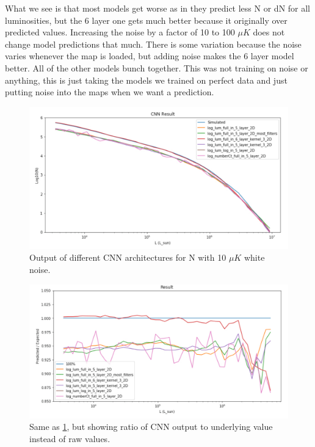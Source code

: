 \documentclass{article}
\begin{document}
			What we see is that most models get worse as in they predict less N or dN for all luminosities, but the 6 layer one gets much better because it originally over predicted values.  Increasing the noise by a factor of 10 to 100 \(\mu K\) does not change model predictions that much.  There is some variation because the noise varies whenever the map is loaded, but adding noise makes the 6 layer model better.  All of the other models bunch together.  This was not training on noise or anything, this is just taking the models we trained on perfect data and just putting noise into the maps when we want a prediction.  

			\begin{figure}[H]
				\centering
				\includegraphics[width=1.0\textwidth]{arch_compare_noise_n.pdf}
				\caption{Output of different CNN architectures for N with 10 \(\mu K\) white noise.}
				\label{fig:arch_compare_noise_n}
			\end{figure}

			\begin{figure}[H]
				\centering
				\includegraphics[width=1.0\textwidth]{arch_compare_noise_n_ratio.pdf}
				\caption{Same as \cref{fig:arch_compare_noise_n}, but showing ratio of CNN output to underlying value instead of raw values.}
				\label{fig:arch_compare_noise_n_ratio}
			\end{figure}
\end{document}
